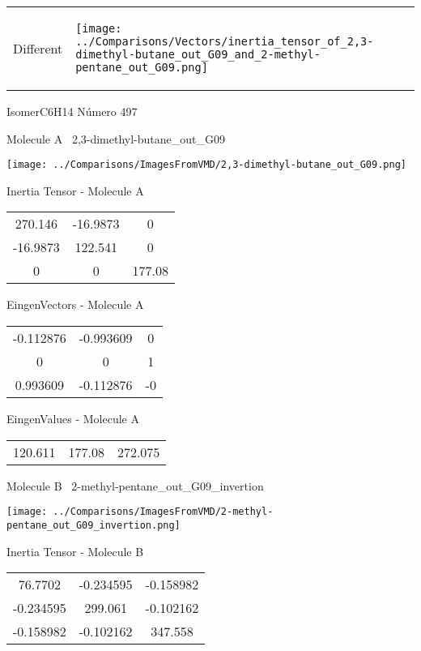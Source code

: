 \vtab[-5mm]
\begin{tabular}{*{2}{m{}}}
\begin{center}
\textcolor{NavyBlue}{\Large Different}
\end{center}
&
\begin{center}
\texttt{[image: ../Comparisons/Vectors/inertia\_tensor\_of\_2,3-dimethyl-butane\_out\_G09\_and\_2-methyl-pentane\_out\_G09.png]}
\end{center}
\end{tabular}

 \newpage

\vtab[-3cm]
\begin{center}
{\large IsomerC6H14 \tab Número 497}
\end{center}
\begin{multicols}{2}
\begin{center}

Molecule A \
2,3-dimethyl-butane\_out\_G09

\texttt{[image: ../Comparisons/ImagesFromVMD/2,3-dimethyl-butane\_out\_G09.png]}

Inertia Tensor - Molecule A \\
\begin{tabular}{|c c c|}
270.146	 & 	-16.9873	 & 	0	 \\
-16.9873	 & 	122.541	 & 	0	 \\
0	 & 	0	 & 	177.08
\end{tabular}

\vtab
 EingenVectors - Molecule A     \\
\begin{tabular}{|c c c|}
-0.112876	 & 	-0.993609	 & 	0	 \\
0	 & 	0	 & 	1	 \\
0.993609	 & 	-0.112876	 & 	-0
\end{tabular}

\vtab
 EingenValues - Molecule A     \\
\begin{tabular}{|c c c|}
120.611	 & 	177.08	 & 	272.075	 \\
\end{tabular}
\columnbreak

Molecule B \
2-methyl-pentane\_out\_G09\_invertion

\texttt{[image: ../Comparisons/ImagesFromVMD/2-methyl-pentane\_out\_G09\_invertion.png]}

Inertia Tensor - Molecule B \\
\begin{tabular}{|c c c|}
76.7702	 & 	-0.234595	 & 	-0.158982	 \\
-0.234595	 & 	299.061	 & 	-0.102162	 \\
-0.158982	 & 	-0.102162	 & 	347.558
\end{tabular}


\end{center}
\end{multicols}
